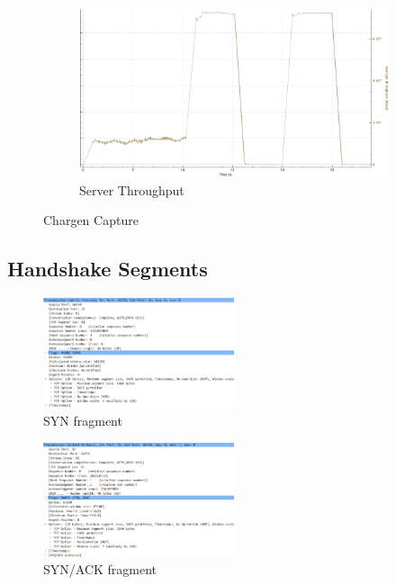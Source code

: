 \documentclass{exam}
\begin{document}
\begin{figure}[H]
\begin{subfigure}[b]{0.4\textwidth}
        \centering
        \includegraphics[width=\textwidth]{base_test/throughput.png}
        \caption{Server Throughput}
        \label{fig:throughput}
    \end{subfigure} 
    \caption{Chargen Capture}
\end{figure}

\subsection{Handshake Segments}
\begin{figure}[H]
    \centering
    \includegraphics[width=0.50\textwidth]{TWH_Syn.png}
    \caption{SYN fragment}
    \label{fig:syn_fragment}
\end{figure}

\begin{figure}[H]
    \centering
    \includegraphics[width=0.50\textwidth]{TWH_SynAck.png}
    \caption{SYN/ACK fragment}
    \label{fig:synack_fragment}
\end{figure}
\end{document}
